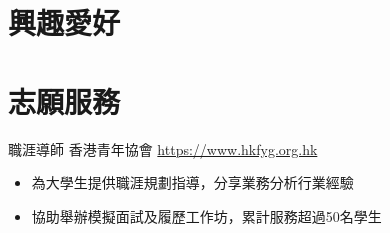 \documentclass[a4paper, serif, 10pt]{moderncv}
\begin{document}
\section{興趣愛好}

\section{志願服務}

        {職涯導師}
        {香港青年協會}
        {\url{https://www.hkfyg.org.hk}}
        {}
        {\begin{itemize}
\item 為大學生提供職涯規劃指導，分享業務分析行業經驗
\item 協助舉辦模擬面試及履歷工作坊，累計服務超過50名學生
\end{itemize}}
    
\end{document}

